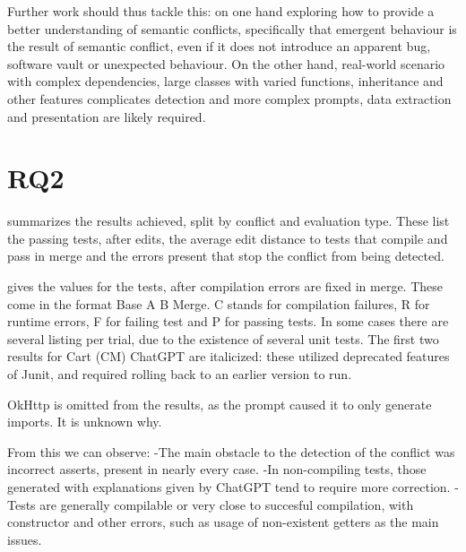 Further work should thus tackle this: on one hand exploring how to provide a better understanding of semantic conflicts, specifically that emergent behaviour is the result of semantic conflict, even if it does not introduce an apparent bug, software vault or unexpected behaviour.
On the other hand, real-world scenario with complex dependencies, large classes with varied functions, inheritance and other features complicates detection and more complex prompts, data extraction and presentation are likely required.

\section{RQ2}\label{sec:results:rq2}

 summarizes the results achieved, split by conflict and evaluation type.
These list the passing tests, after edits, the average edit distance to tests that compile and pass in merge 
and the errors present that stop the conflict from being detected.

 gives the values for the tests, after compilation errors are fixed in merge.
These come in the format Base A B Merge. C stands for compilation failures, R for runtime errors, F for failing test and P for passing tests.
In some cases there are several listing per trial, due to the existence of several unit tests.
The first two results for Cart (CM) ChatGPT are italicized: these utilized deprecated features of Junit, and required rolling back to an earlier
version to run.

OkHttp is omitted from the results, as the prompt caused it to only generate imports. It is unknown why.

From this we can observe:
-The main obstacle to the detection of the conflict was incorrect asserts, present in nearly every case.
-In non-compiling tests, those generated with explanations given by ChatGPT tend to require more correction.
-Tests are generally compilable or very close to succesful compilation, with constructor and other errors, such as usage of non-existent getters as the main issues.

